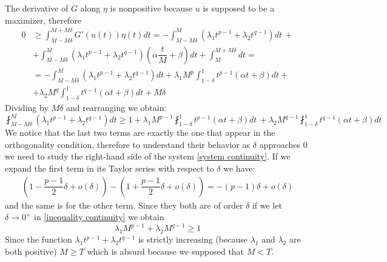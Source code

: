 \documentclass[corpo=11pt, stile=classica, tipotesi=custom,
greek, evenboxes, english]{toptesi}
\numberwithin{equation}{chapter}
\begin{document}
The derivative of $G$ along $\eta$ is nonpositive because $u$ is supposed to be a maximizer, therefore
\begin{align*}
	0 &\geq \int_{M-M\delta}^{M+M\delta} G'(u(t))\eta(t)dt = -\int_{M-M\delta}^M \left(\lambda_1 t^{p-1} + \lambda_2 t^{q-1}\right) dt\, +\\
	  &+ \int_{M-M\delta}^M \left(\lambda_1 t^{p-1} + \lambda_2 t^{q-1}\right)\left(\alpha \dfrac{t}{M}+\beta\right) dt + \int_M^{M+M\delta}dt = \\
	  &= -\int_{M-M\delta}^M \left(\lambda_1 t^{p-1} + \lambda_2 t^{q-1}\right) dt + \lambda_1 M^p \int_{1-\delta}^1 t^{p-1}(\alpha t + \beta) dt +\\
	  &+ \lambda_2 M^q \int_{1-\delta}^1 t^{q-1}(\alpha t + \beta) dt + M\delta
\end{align*}
Dividing by $M\delta$ and rearranging we obtain:
\begin{equation}\label{inequality continuity}
	\fint_{M-M\delta}^M \left(\lambda_1 t^{p-1} + \lambda_2 t^{q-1}\right) dt \geq  1 + \lambda_1 M^{p-1} \fint_{1-\delta}^1 t^{p-1}(\alpha t + \beta) dt\, + \lambda_2 M^{q-1} \fint_{1-\delta}^1 t^{q-1}(\alpha t + \beta) dt
\end{equation}
We notice that the last two terms are exactly the one that appear in the orthogonality condition, therefore to understand their behavior as $\delta$ approaches 0 we need to study the right-hand side of the system \eqref{system continuity}. If we expand the first term in its Taylor series with respect to $\delta$ we have:
\begin{align*}
	\left(1-\dfrac{p-1}{2}\delta + o(\delta) \right) - \left(1+\dfrac{p-1}{2}\delta + o(\delta) \right) = -(p-1)\delta + o(\delta)
\end{align*}
and the same is for the other term. Since they both are of order $\delta$ if we let $\delta \rightarrow 0^+$ in \eqref{inequality continuity} we obtain
\begin{equation*}
	\lambda_1 M^{p-1} + \lambda_2 M^{q-1} \geq 1
\end{equation*}
Since the function $\lambda_1 t^{p-1}  + \lambda_2 t^{q-1}$ is strictly increasing (because $\lambda_1$ and $\lambda_2$ are both positive) $M \geq T$ which is absurd because we supposed that $M<T$.
\end{document}
